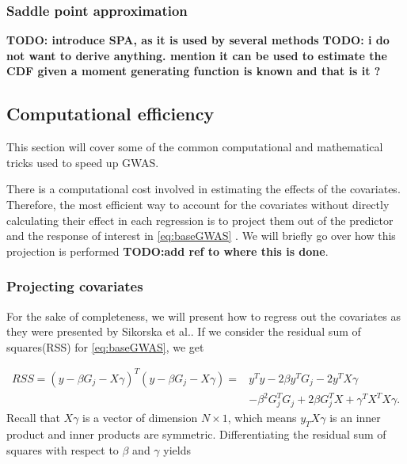 \subsubsection{Saddle point approximation}
\textbf{TODO: introduce SPA, as it is used by several methods}
\textbf{TODO: i do not want to derive anything. mention it can be used to estimate the CDF given a moment generating function is known and that is it ?}



\subsection{Computational efficiency}
This section will cover some of the common computational and mathematical tricks used to speed up GWAS. 

There is a computational cost involved in estimating the effects of the covariates. Therefore, the most efficient way to account for the covariates without directly calculating their effect in each regression is to project them out of the predictor and the response of interest in \cref{eq:baseGWAS} \cite{sikorska2013gwas}. We will briefly go over how this projection is performed \textbf{TODO:add ref to where this is done}.

\subsubsection{Projecting covariates}
For the sake of completeness, we will present how to regress out the covariates as they were presented by Sikorska et al.\cite{sikorska2013gwas}. If we consider the residual sum of squares(RSS) for \cref{eq:baseGWAS}, we get 

\begin{align}
	RSS = \left( y - \beta G_j - X\gamma \right)^T\left( y - \beta G_j - X\gamma \right) = &y^T y - 2\beta y^T G_j - 2y^TX\gamma \\
	&- \beta^2 G_j^TG_j + 2\beta G_j^T X + \gamma^T X^T X \gamma.
\end{align}
Recall that $ X\gamma $ is a vector of dimension $ N \times 1 $, which means $ y_T X \gamma $ is an inner product and inner products are symmetric. Differentiating the residual sum of squares with respect to $ \beta $ and $ \gamma $ yields

